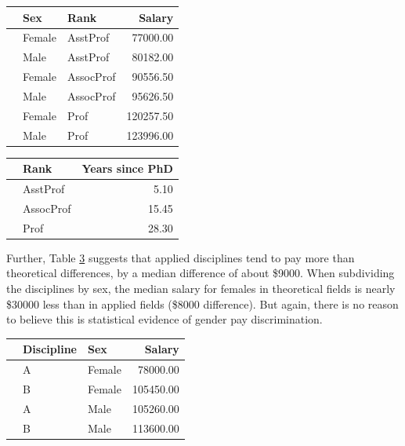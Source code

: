 \documentclass{article}
\begin{document}
\begin{table}[ht]
\centering
{} \label{t3} 

\begin{tabular}{rllr}
  \hline
 & Sex & Rank & Salary \\ 
  \hline
 & Female & AsstProf & 77000.00 \\ 
   & Male & AsstProf & 80182.00 \\ 
   & Female & AssocProf & 90556.50 \\ 
   & Male & AssocProf & 95626.50 \\ 
   & Female & Prof & 120257.50 \\ 
   & Male & Prof & 123996.00 \\ 
   \hline
\end{tabular}
\end{table}

\begin{table}[ht]
\centering
{} \label{t4} 
\begin{tabular}{rlr}
  \hline
 & Rank & Years since PhD \\ 
  \hline
 & AsstProf & 5.10 \\ 
   & AssocProf & 15.45 \\ 
   & Prof & 28.30 \\ 
   \hline
\end{tabular}
\end{table}

Further, Table \ref{t5} suggests that applied disciplines tend to pay more than theoretical differences, by a median difference of about \$9000. When subdividing the disciplines by sex, the median salary for females in theoretical fields is nearly \$30000 less than in applied fields (\$8000 difference). But again, there is no reason to believe this is statistical evidence of gender pay discrimination. 

\begin{table}[!htb]
\centering
{} \label{t5} 
\begin{tabular}{rllr}
  \hline
 & Discipline & Sex & Salary \\ 
  \hline
 & A & Female & 78000.00 \\ 
   & B & Female & 105450.00 \\ 
   & A & Male & 105260.00 \\ 
   & B & Male & 113600.00 \\ 
   \hline
\end{tabular}
\end{table}
\end{document}
